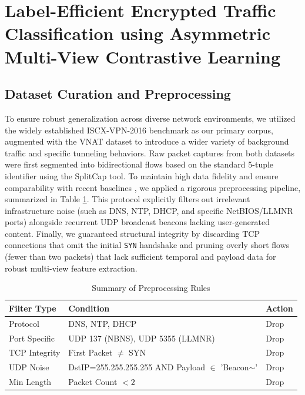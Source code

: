 \section{Label-Efficient Encrypted Traffic Classification using Asymmetric Multi-View Contrastive Learning}
\label{sec:methodology}

\subsection{Dataset Curation and Preprocessing}
\label{subsec:dataset_curation}

To ensure robust generalization across diverse network environments, we utilized the widely established ISCX-VPN-2016 benchmark \cite{draper2016characterization} as our primary corpus, augmented with the VNAT dataset \cite{vnat_dataset} to introduce a wider variety of background traffic and specific tunneling behaviors. Raw packet captures from both datasets were first segmented into bidirectional flows based on the standard 5-tuple identifier using the SplitCap tool. To maintain high data fidelity and ensure comparability with recent baselines \cite{park2024fast}, we applied a rigorous preprocessing pipeline, summarized in Table \ref{tab:preprocessing_rules}. This protocol explicitly filters out irrelevant infrastructure noise (such as DNS, NTP, DHCP, and specific NetBIOS/LLMNR ports) alongside recurrent UDP broadcast beacons lacking user-generated content. Finally, we guaranteed structural integrity by discarding TCP connections that omit the initial \texttt{SYN} handshake and pruning overly short flows (fewer than two packets) that lack sufficient temporal and payload data for robust multi-view feature extraction.

\begin{table}[htbp]
\caption{Summary of Preprocessing Rules}
\label{tab:preprocessing_rules}
\centering
\begin{tabular}{l l l}
\hline
\textbf{Filter Type} & \textbf{Condition} & \textbf{Action} \\
\hline
Protocol & DNS, NTP, DHCP & Drop \\
Port Specific & UDP 137 (NBNS), UDP 5355 (LLMNR) & Drop \\
TCP Integrity & First Packet $\neq$ SYN & Drop \\
UDP Noise & DstIP=255.255.255.255 AND Payload $\in$ 'Beacon$\sim$' & Drop \\
Min Length & Packet Count $< 2$ & Drop \\
\hline
\end{tabular}
\end{table}


